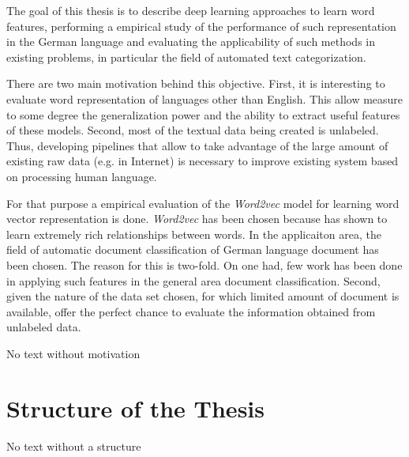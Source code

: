 \label{sec:motivation}

The goal of this thesis is to describe deep learning approaches to learn word features,  performing a empirical study of the performance of such representation in the German language and evaluating the applicability of such methods in existing problems, in particular the field of automated text categorization. 

There are two  main motivation behind this objective. First, it is interesting to evaluate word representation of languages other than English. This allow measure to some degree the generalization power and the ability to extract useful features of these models. Second, most of the textual data being created is unlabeled. Thus, developing pipelines that allow to take advantage of the large amount of existing raw data (e.g. in Internet) is necessary to improve existing system based on processing human language.

For that purpose a empirical evaluation of the \textit{Word2vec} model for learning word vector representation is done. \textit{Word2vec} has been chosen because has shown to learn extremely rich relationships between words. In the applicaiton area, the field of automatic document classification of German language document has been chosen. The reason for this is two-fold. On one had, few work has been done in applying such features in the general area document classification. Second, given the nature of the data set chosen,  for which limited amount of document is available, offer the perfect chance to evaluate the information obtained from unlabeled data. 






No text without motivation

\section{Structure of the Thesis}
\label{sec:structure-thesis}
No text without a structure




 



